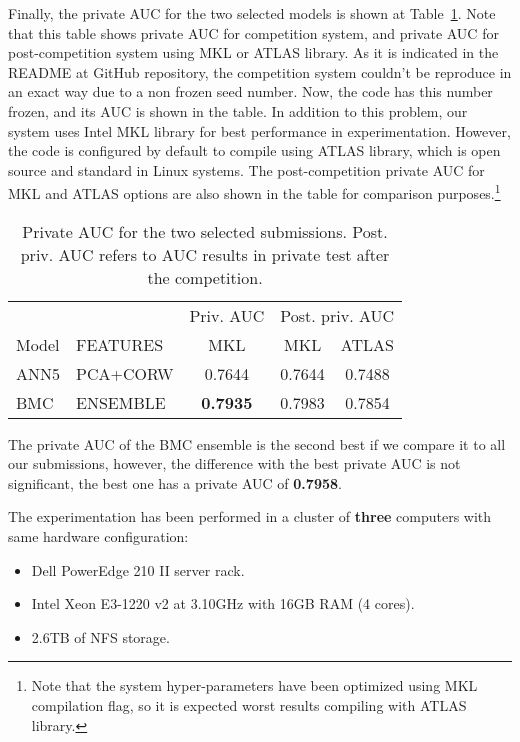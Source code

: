 \documentclass[a4paper,english,twoside]{article}
\begin{document}
Finally, the private AUC for the two selected models is shown at
Table~\ref{tab:private}. Note that this table shows private AUC for competition
system, and private AUC for post-competition system using MKL or ATLAS
library. As it is indicated in the README at GitHub repository, the competition
system couldn't be reproduce in an exact way due to a non frozen seed number.
Now, the code has this number frozen, and its AUC is shown in the table. In
addition to this problem, our system uses Intel MKL library for best performance
in experimentation. However, the code is configured by default to compile using
ATLAS library, which is open source and standard in Linux systems. The
post-competition private AUC for MKL and ATLAS options are also shown in the
table for comparison purposes.\footnote{Note that the system hyper-parameters
  have been optimized using MKL compilation flag, so it is expected worst
  results compiling with ATLAS library.}

\begin{table}
  \centering
  \begin{tabular}{|l|l|c||c|c|}
    \hline
          &          & Priv. AUC & \multicolumn{2}{|c|}{Post. priv. AUC}\\
    Model & FEATURES & MKL & \multicolumn{1}{|c}{MKL} & \multicolumn{1}{c|}{ATLAS} \\
    \hline
    \hline
    ANN5 & PCA+CORW & 0.7644          & 0.7644 & 0.7488\\
    BMC & ENSEMBLE & \textbf{0.7935}  & 0.7983 & 0.7854\\
    \hline
  \end{tabular}
  \caption{Private AUC for the two selected submissions. Post. priv. AUC refers
    to AUC results in private test after the competition.\label{tab:private}}
\end{table}

The private AUC of the BMC ensemble is the second best if we compare it
to all our submissions, however, the difference with the best private
AUC is not significant, the best one has a private AUC of
\textbf{0.7958}.

The experimentation has been performed in a cluster of \textbf{three}
computers with same hardware configuration:

\begin{itemize}
\item
  Dell PowerEdge 210 II server rack.
\item
  Intel Xeon E3-1220 v2 at 3.10GHz with 16GB RAM (4 cores).
\item
  2.6TB of NFS storage.
\end{itemize}
\end{document}
